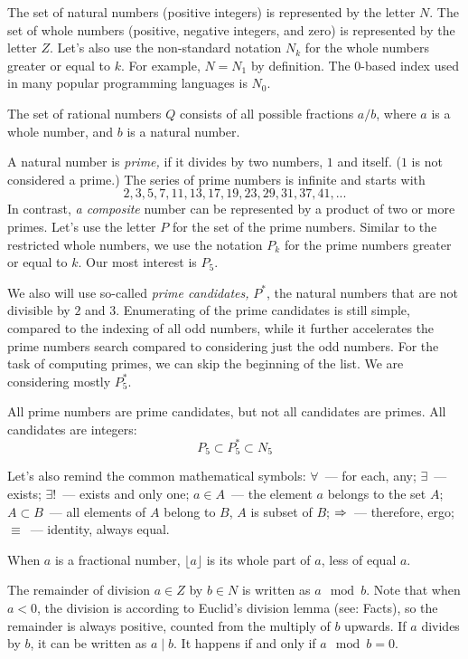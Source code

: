 The set of natural numbers (positive integers) is represented by the letter $N$. 
The set of whole numbers (positive, negative integers, and zero) is represented by the letter $Z$.
Let's also use the non-standard notation $N_k$ for the whole numbers greater or equal to $k$.
For example, $N=N_1$ by definition. The 0-based index used in many popular programming
languages is $N_0$.

The set of rational numbers $Q$ consists of all possible fractions $a/b$, where $a$ is a whole number, and
$b$ is a natural number.

A natural number is {\it prime,\/} if it divides by two numbers, $1$ and itself. ($1$ is not considered a prime.)
The series of prime numbers is infinite and starts with
$$
2, 3, 5, 7, 11, 13, 17, 19, 23, 29, 31, 37, 41,  ...
$$
In contrast, {\it a composite\/} number can be represented by a product of two or more primes.
Let's use the letter $P$ for the set of the prime numbers. Similar to the restricted whole numbers,
we use the notation $P_k$ for the prime numbers greater or equal to $k$. Our most interest is $P_5$.

We also will use so-called {\it prime candidates,\/} $P^*$, the natural numbers that are not divisible
by $2$ and $3$. Enumerating of the prime candidates is still simple, compared to the indexing of all odd numbers,
while it further accelerates the prime numbers search compared to considering just the odd numbers.
For the task of computing primes, we can skip the beginning of the list. We are considering mostly $P_5^*$.

All prime numbers are prime candidates, but not all candidates are primes. All candidates are integers:
$$
P_5 \subset P_5^* \subset N_5
$$

Let's also remind the common mathematical symbols: $\forall$~--- for each, any; $\exists$~--- exists;
$\exists!$~--- exists and only one; $a \in A$~--- the element $a$ belongs to the set $A$;
$A \subset B$~--- all elements of $A$ belong to $B$, $A$ is subset of $B$; $\Rightarrow$~--- therefore, ergo;
$\equiv$~--- identity, always equal.

When $a$ is a fractional number, $\lfloor a \rfloor$ is its whole part of $a$, less of equal $a$.

The remainder of division $a \in Z$ by $b \in N$ is written as $a \mod b$. Note that when $a<0$,
the division is according to Euclid's division lemma (see: Facts), so the remainder is always positive,
counted from the multiply of $b$ upwards. If $a$ divides by $b$, it can be written as $a \mid b$.
It happens if and only if $a \mod b = 0$.

